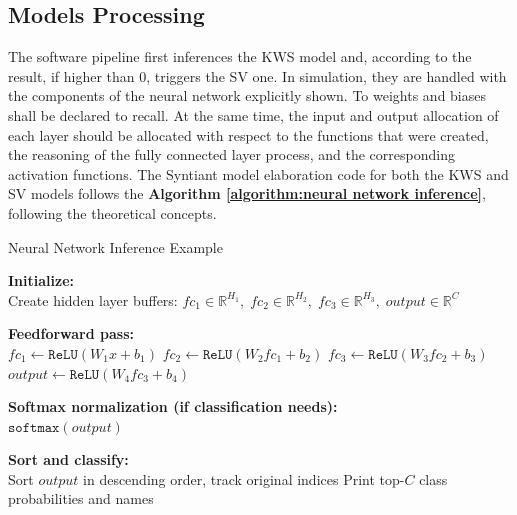 \subsection{Models Processing}
The software pipeline first inferences the KWS model and, according to the result, if higher than 0, triggers the SV one. In simulation, they are handled with the components of the neural network explicitly shown. To weights and biases shall be declared to recall. At the same time, the input and output allocation of each layer should be allocated with respect to the functions that were created, the reasoning of the fully connected layer process, and the corresponding activation functions. The Syntiant model elaboration code for both the KWS and SV models follows the \textbf{Algorithm \ref{algorithm:neural network inference}}\footnotemark{}, following the theoretical concepts.\newline
\begin{algorithm}[H]
\caption{Neural Network Inference Example}
\label{algorithm:neural network inference}

\textbf{Initialize:} \\
\Indp
Create hidden layer buffers:
$fc_1 \in \mathbb{R}^{H_1}, \;
fc_2 \in \mathbb{R}^{H_2}, \;
fc_3 \in \mathbb{R}^{H_3}, \;
output \in \mathbb{R}^{C}$ \;
\Indm

\textbf{Feedforward pass:} \\
\Indp
$fc_1 \gets \texttt{ReLU}(W_1 x + b_1)$ \;
$fc_2 \gets \texttt{ReLU}(W_2 fc_1 + b_2)$ \;
$fc_3 \gets \texttt{ReLU}(W_3 fc_2 + b_3)$ \;
$output \gets \texttt{ReLU}(W_4 fc_3 + b_4)$ \;
\Indm

\textbf{Softmax normalization (if classification needs):} \\
\Indp
$\texttt{softmax}(output)$ \;
\Indm

\textbf{Sort and classify:} \\
\Indp
Sort $output$ in descending order, track original indices \;
Print top-$C$ class probabilities and names \;
\Indm

\end{algorithm}

